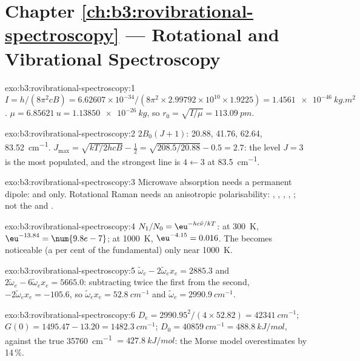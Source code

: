 \section*{Chapter \ref{ch:b3:rovibrational-spectroscopy} --- Rotational and Vibrational Spectroscopy}

\begin{solution}{exo:b3:rovibrational-spectroscopy:1}
$I = h/(8\pi^2cB) = 6.62607 \times 10^{-34}/(8\pi^2 \times 2.99792 \times 10^{10} \times
1.9225) = \qty{1.4561e-46}{kg.m^2}$. $\mu = \qty{6.85621}{u} = \qty{1.13850e-26}{kg}$, so
$r_0 = \sqrt{I/\mu} = \qty{113.09}{pm}$.
\end{solution}

\begin{solution}{exo:b3:rovibrational-spectroscopy:2}
$2B_0(J+1)$: 20.88, 41.76, 62.64, \qty{83.52}{cm^{-1}}. $J_{\max} = \sqrt{kT/2hcB} -
\frac12 = \sqrt{208.5/20.88} - 0.5 = 2.7$: the level $J = 3$ is the most
populated, and the strongest line is $4 \leftarrow 3$ at \qty{83.5}{cm^{-1}}.
\end{solution}

\begin{solution}{exo:b3:rovibrational-spectroscopy:3}
Microwave absorption needs a permanent dipole:  and  only.
Rotational Raman needs an anisotropic polarisability: , , ,
, ; not the   and .
\end{solution}

\begin{solution}{exo:b3:rovibrational-spectroscopy:4}
$N_1/N_0 = \eu^{-hc\tilde\nu/kT}$: at \qty{300}{K}, $\eu^{-13.84} = \num{9.8e-7}$; at
\qty{1000}{K}, $\eu^{-4.15} = 0.016$. The  becomes noticeable (a per cent of
the fundamental) only near \qty{1000}{K}.
\end{solution}

\begin{solution}{exo:b3:rovibrational-spectroscopy:5}
$\tilde\omega_e - 2\tilde\omega_ex_e = 2885.3$ and $2\tilde\omega_e - 6\tilde\omega_ex_e =
5665.0$: subtracting twice the first from the second, $-2\tilde\omega_ex_e = -105.6$,
so $\tilde\omega_ex_e = \qty{52.8}{cm^{-1}}$ and $\tilde\omega_e = \qty{2990.9}{cm^{-1}}$.
\end{solution}

\begin{solution}{exo:b3:rovibrational-spectroscopy:6}
$D_e = 2990.95^2/(4 \times 52.82) = \qty{42341}{cm^{-1}}$; $G(0) = 1495.47 - 13.20 =
\qty{1482.3}{cm^{-1}}$; $D_0 = \qty{40859}{cm^{-1}} = \qty{488.8}{kJ/mol}$, against the true
\qty{35760}{cm^{-1}} $= \qty{427.8}{kJ/mol}$: the Morse model overestimates by 14\,\%.
\end{solution}

